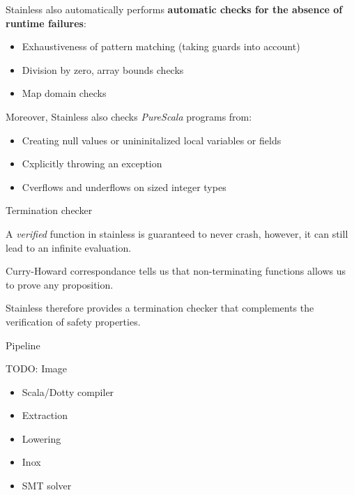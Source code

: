 \documentclass[
  ignorenonframetext,
]{beamer}
\providecommand{\tightlist}{%
  \setlength{\itemsep}{0pt}\setlength{\parskip}{0pt}}
\begin{document}
\begin{frame}

Stainless also automatically performs \textbf{automatic checks for the
absence of runtime failures}:

\begin{itemize}
\tightlist
\item
  Exhaustiveness of pattern matching (taking guards into account)
\item
  Division by zero, array bounds checks
\item
  Map domain checks
\end{itemize}

\end{frame}

\begin{frame}

Moreover, Stainless also checks \emph{PureScala} programs from:

\begin{itemize}
\tightlist
\item
  Creating null values or unininitalized local variables or fields
\item
  Cxplicitly throwing an exception
\item
  Cverflows and underflows on sized integer types
\end{itemize}

\end{frame}

\begin{frame}{Termination checker}
\protect\hypertarget{termination-checker}{}

A \emph{verified} function in stainless is guaranteed to never crash,
however, it can still lead to an infinite evaluation.

Curry-Howard correspondance tells us that non-terminating functions
allows us to prove any proposition.

Stainless therefore provides a termination checker that complements the
verification of safety properties.

\end{frame}

\begin{frame}{Pipeline}
\protect\hypertarget{pipeline}{}

TODO: Image

\begin{itemize}
\tightlist
\item
  Scala/Dotty compiler
\item
  Extraction
\item
  Lowering
\item
  Inox
\item
  SMT solver
\end{itemize}

\end{frame}
\end{document}
